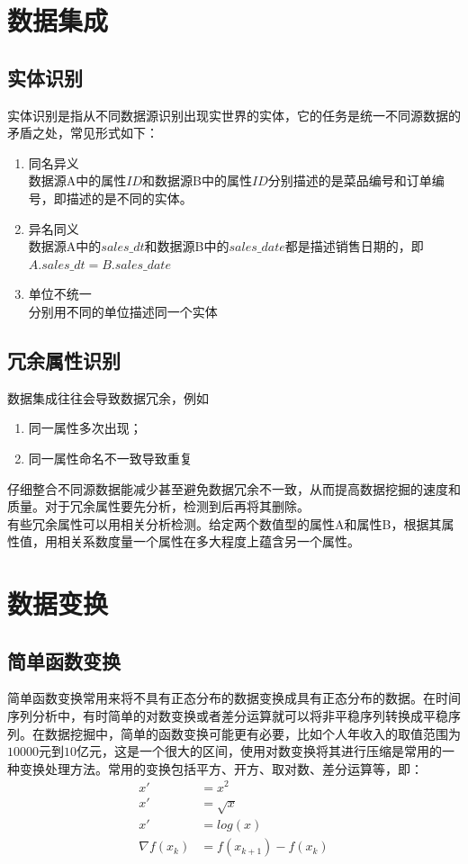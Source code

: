 \documentclass[openany]{progbookcn}
\begin{document}
\section{数据集成}
\subsection{实体识别}
\indent 实体识别是指从不同数据源识别出现实世界的实体，它的任务是统一不同源数据的矛盾之处，常见形式如下：
\begin{enumerate}
\item 同名异义\\
\indent 数据源A中的属性$ID$和数据源B中的属性$ID$分别描述的是菜品编号和订单编号，即描述的是不同的实体。
\item 异名同义\\
\indent 数据源A中的$sales\_dt$和数据源B中的$sales\_date$都是描述销售日期的，即$A.sales\_dt=B.sales\_date$
\item 单位不统一\\
\indent 分别用不同的单位描述同一个实体
\end{enumerate}
\subsection{冗余属性识别}
\indent 数据集成往往会导致数据冗余，例如
\begin{enumerate}[itemindent=2em]
\item 同一属性多次出现；
\item 同一属性命名不一致导致重复
\end{enumerate}
\indent \indent 仔细整合不同源数据能减少甚至避免数据冗余不一致，从而提高数据挖掘的速度和质量。对于冗余属性要先分析，检测到后再将其删除。\\
\indent 有些冗余属性可以用相关分析检测。给定两个数值型的属性A和属性B，根据其属性值，用相关系数度量一个属性在多大程度上蕴含另一个属性。
\section{数据变换}
\subsection{简单函数变换}
\indent 简单函数变换常用来将不具有正态分布的数据变换成具有正态分布的数据。在时间序列分析中，有时简单的对数变换或者差分运算就可以将非平稳序列转换成平稳序列。在数据挖掘中，简单的函数变换可能更有必要，比如个人年收入的取值范围为$10000$元到$10$亿元，这是一个很大的区间，使用对数变换将其进行压缩是常用的一种变换处理方法。常用的变换包括平方、开方、取对数、差分运算等，即：
\begin{equation}\nonumber
\begin{aligned}
x'&=x^2\\
x'&=\sqrt{x}\\
x'&=log(x)\\
\nabla f(x_k)&=f(x_{k+1})-f(x_k)
\end{aligned}
\end{equation}
\end{document}
